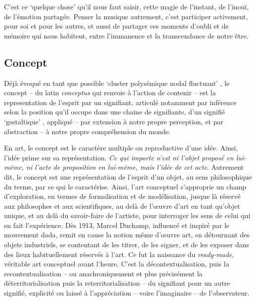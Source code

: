 \documentclass{article}
\newcommand{\footref}[1]{%
  \enotezwritemark{\enmarkstyle\ref{#1}}%
}
\begin{document}
C'est ce `quelque chose' qu'il nous faut saisir, cette magie de l'instant, de l'inouï, de l'émotion partagée. Penser la musique autrement, c'est participer activement, pour soi et pour les autres, et aussi de partager ces moments d'oubli et de mémoire qui nous habitent, entre l'immanence et la transcendance de notre être.

%
%

\subsection{Concept} %

Déjà évoqué en tant que possible `cluster polysémique nodal fluctuant'%
, le concept -- du latin \textit{conceptus} qui renvoie à l'action de contenir -- est la representation de l'esprit par un signifiant, articulé notamment par inférence selon la position qu’il occupe dans une chaine de signifiants, d'un signifié `gestaltique'%
, appliqué -- par extension à notre propre perception, et par abstraction -- à notre propre compréhension du monde. 

En art, le concept est le caractère multiple ou reproductive d'une idée. Ainsi, l'idée prime sur sa représentation. \textit{Ce qui importe n’est ni l’objet proposé en lui-même, ni l’acte de proposition en lui-même, mais l’idée de cet acte}. Autrement dit, le concept est une représentation de l’esprit d’un objet, au sens philosophique du terme, par ce qui le caractérise.
Ainsi, l'art conceptuel s'approprie un champ d'exploration, en termes de formalisation et de modélisation, jusque là réservé aux philosophes et aux scientifiques, au delà de l'œuvre d'art en tant qu'objet unique, et au delà du savoir-faire de l'artiste, pour interroger les sens de celui qui en fait l'expérience.
Dès 1913, Marcel Duchamp, influencé et inspiré par le mouvement dada, remit en cause la notion même d'œuvre art, en détournant des objets industriels, se contentant de les titrer, de les signer, et de les exposer dans des lieux habituellement réservés à l'art. Ce fut la naissance du \textit{ready-made}, véritable art conceptuel avant l'heure. C'est la décontextualisation, puis la recontextualisation -- ou anachroniquement et plus précisément la déterritorialisation puis la reterritorialisation -- du signifiant pour un autre signifié, explicité ou laissé à l'appréciation -- voire l'imaginaire -- de l'observateur. 
\end{document}
